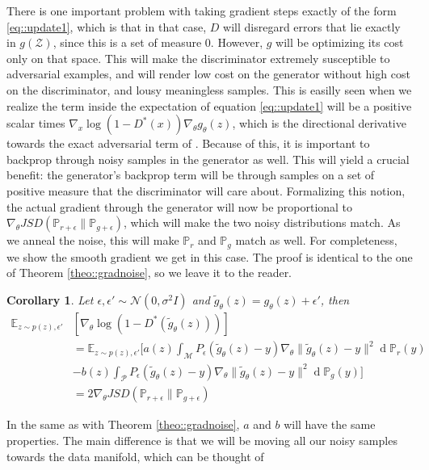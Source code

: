 \documentclass{article} %
\newcommand\EE{\mathbb{E}}
\newcommand\manP{\mathcal{P}}
\newcommand\manM{\mathcal{M}}
\newcommand\PP{\mathbb{P}}
\renewcommand{\d}[1]{\ensuremath{\operatorname{d}\!{#1}}}
\newtheorem{coro}{Corollary}[section]
\theoremstyle{definition}
\begin{document}
There is one important problem with taking gradient steps exactly of the form \eqref{eq::update1},
which is that in that case, $D$ will disregard errors that lie exactly in $g(\mathcal{Z})$, since
this is a set of measure 0. However, $g$ will be optimizing its cost only on that
space. This will make the discriminator extremely susceptible to adversarial examples, and will render
low cost on the generator without high cost on the discriminator, and lousy meaningless samples.
This is easilly seen when we realize
the term inside the expectation of equation \eqref{eq::update1} will be a positive scalar times $\nabla_x \log(1 - D^*(x)) \nabla_\theta
g_\theta(z)$, which is the directional derivative towards the exact adversarial term of \cite{Good-ea-Adv}. Because of this,
it is important to backprop through noisy samples in the generator as well. This will yield a crucial
benefit: the generator's backprop term will be through samples on a set of positive measure that
the discriminator will care about. Formalizing this notion, the actual gradient through the
generator will now be proportional to $\nabla_\theta JSD(\PP_{r + \epsilon} \| \PP_{g + \epsilon})$,
which will make the two noisy distributions match. As we anneal the noise, this will make $\PP_r$ and
$\PP_g$ match as well. For completeness, we show the smooth gradient we get
in this case. The proof is identical to the one of Theorem \autoref{theo::gradnoise}, so we leave it
to the reader.
\begin{coro} \label{coro::gradnoise} Let $\epsilon, \epsilon' \sim \mathcal{N}(0, \sigma^2 I)$ and 
$\tilde g_\theta(z) = g_\theta(z) + \epsilon'$, then
\begin{align}
\EE_{z \sim p(z), \epsilon'} &\left[ \nabla_\theta \log(1 - D^*(\tilde g_\theta(z))) \right] \label{eq::update2}\\
&= \EE_{z \sim p(z), \epsilon'}\bigg[a(z) \int_\manM P_\epsilon(\tilde g_\theta(z)-y) \nabla_\theta 
\|\tilde g_\theta(z)-y\|^2 \d \PP_r(y) \nonumber
\\&- b(z) \int_\manP P_\epsilon(\tilde g_\theta(z)-y) \nabla_\theta 
\|\tilde g_\theta(z) - y\|^2 \d \PP_g(y) \bigg] \nonumber
\\ &= 2 \nabla_\theta JSD(\PP_{r + \epsilon} \| \PP_{g + \epsilon}) \nonumber
\end{align}
\end{coro}
In the same as with Theorem \autoref{theo::gradnoise}, $a$ and $b$ will have the same properties. The main difference
is that we will be moving all our noisy samples towards the data manifold, which can be thought of
\end{document}
